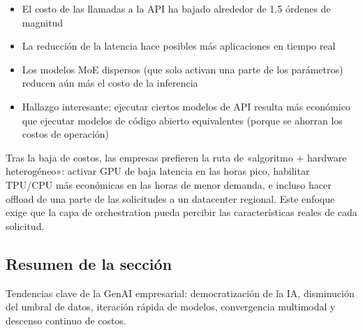 \begin{itemize}
    \item El costo de las llamadas a la API ha bajado alrededor de 1.5 órdenes de magnitud
    \item La reducción de la latencia hace posibles más aplicaciones en tiempo real
    \item Los modelos MoE dispersos (que solo activan una parte de los parámetros) reducen aún más el costo de la inferencia
    \item Hallazgo interesante: ejecutar ciertos modelos de API resulta más económico que ejecutar modelos de código abierto equivalentes (porque se ahorran los costos de operación)
\end{itemize}

Tras la baja de costos, las empresas prefieren la ruta de «algoritmo + hardware heterogéneo»: activar GPU de baja latencia en las horas pico, habilitar TPU/CPU más económicas en las horas de menor demanda, e incluso hacer offload de una parte de las solicitudes a un datacenter regional. Este enfoque exige que la capa de orchestration pueda percibir las características reales de cada solicitud.

\subsection{Resumen de la sección}

Tendencias clave de la GenAI empresarial: democratización de la IA, disminución del umbral de datos, iteración rápida de modelos, convergencia multimodal y descenso continuo de costos.


